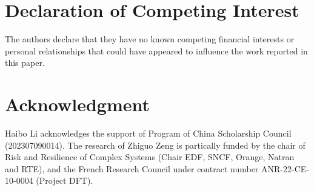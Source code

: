 \documentclass[a4paper,10pt]{cas-sc}
\begin{document}
\section*{Declaration of Competing Interest}  
The authors declare that they have no known competing financial interests or personal relationships that could have appeared to influence the work reported in this paper.

\section*{Acknowledgment}
Haibo Li acknowledges the support of Program of China Scholarship Council (202307090014). The research of Zhiguo Zeng is partically funded by the chair of Risk and Resilience of Complex Systems (Chair EDF, SNCF, Orange, Natran and RTE), and the French Research Council under contract number ANR-22-CE-10-0004 (Project DFT).
\end{document}
